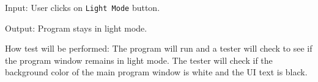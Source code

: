 \documentclass[12pt, titlepage]{article}
\begin{document}
\begin{enumerate}
{Input: User clicks on \texttt{Light Mode} button.

Output: Program stays in light mode.

How test will be performed: The program will run and a tester will check to see if the program window remains in light mode. The tester will check if the background color of the main program window is white and the UI text is black.}


















\end{enumerate}
\end{document}

